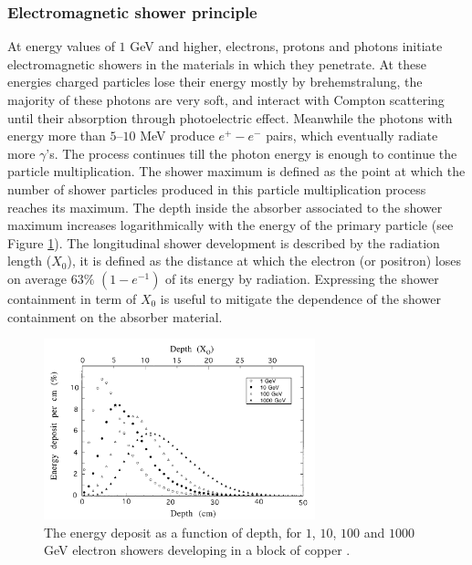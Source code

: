 \subsubsection*{Electromagnetic shower principle}
At energy values of $1$ GeV and higher, electrons, protons and photons initiate electromagnetic showers in the materials in which they penetrate. At these energies charged particles lose their energy mostly by brehemstralung, the majority of these photons are very soft, and interact with Compton scattering until their absorption through photoelectric effect. Meanwhile the photons with energy more than $5–10$ MeV produce $e^+-e^-$ pairs, which eventually radiate more $\gamma$'s. The process continues till the photon energy is enough to continue the particle multiplication. The shower maximum is defined as the point at which the number of shower particles produced in this particle multiplication process reaches its maximum. The depth inside the absorber associated to the shower maximum increases logarithmically with the energy of the primary particle (see Figure \ref{fig:shower_max}). The longitudinal shower development is described by the radiation length ($X_0$), it is defined as the distance at which the electron (or positron) loses on average $63\%$ $(1-e^{-1})$ of its energy by radiation. Expressing the shower containment in term of $X_0$ is useful to mitigate the dependence of the shower containment on the absorber material.

\begin{figure}
	\centering
	\includegraphics[width=0.7\textwidth]{IMG/Cap2/shower_max.png}
	\caption{The energy deposit as a function of depth, for $1$, $10$, $100$ and $1000$ GeV electron showers developing in a block of copper \cite{Leo}.}
	\label{fig:shower_max}
\end{figure}

